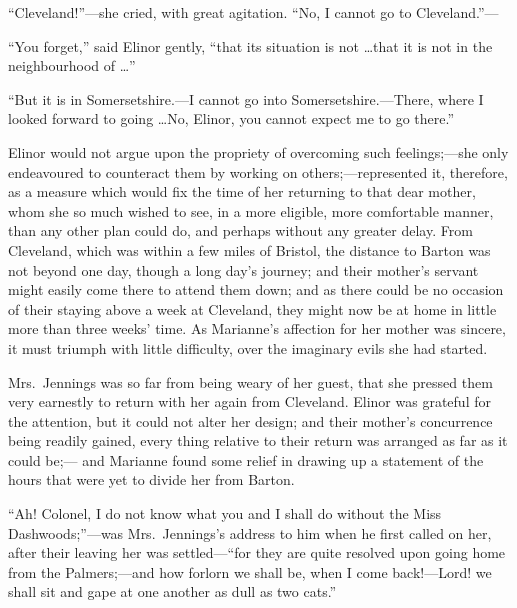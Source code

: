 \documentclass{article}
\begin{document}
``Cleveland!''---she cried, with great agitation.
``No, I cannot go to Cleveland.''---%

``You forget,'' said Elinor gently, ``that its situation
is not \ldots that it is not in the neighbourhood of \ldots''

``But it is in Somersetshire.---I cannot go
into Somersetshire.---There, where I looked forward
to going \ldots No, Elinor, you cannot expect me to go there.''

Elinor would not argue upon the propriety of overcoming
such feelings;---she only endeavoured to counteract them by
working on others;---represented it, therefore, as a measure
which would fix the time of her returning to that dear mother,
whom she so much wished to see, in a more eligible,
more comfortable manner, than any other plan could do,
and perhaps without any greater delay.  From Cleveland,
which was within a few miles of Bristol, the distance to
Barton was not beyond one day, though a long day's journey;
and their mother's servant might easily come there to attend
them down; and as there could be no occasion of their
staying above a week at Cleveland, they might now be at
home in little more than three weeks' time.  As Marianne's
affection for her mother was sincere, it must triumph
with little difficulty, over the imaginary evils she had started.

Mrs.\ Jennings was so far from being weary of her guest,
that she pressed them very earnestly to return with her again
from Cleveland.  Elinor was grateful for the attention,
but it could not alter her design; and their mother's
concurrence being readily gained, every thing relative
to their return was arranged as far as it could be;---%
and Marianne found some relief in drawing up a statement
of the hours that were yet to divide her from Barton.

``Ah! Colonel, I do not know what you and I shall
do without the Miss Dashwoods;''---was Mrs.\ Jennings's
address to him when he first called on her, after their
leaving her was settled---``for they are quite resolved
upon going home from the Palmers;---and how forlorn we
shall be, when I come back!---Lord! we shall sit and gape
at one another as dull as two cats.''
\end{document}
